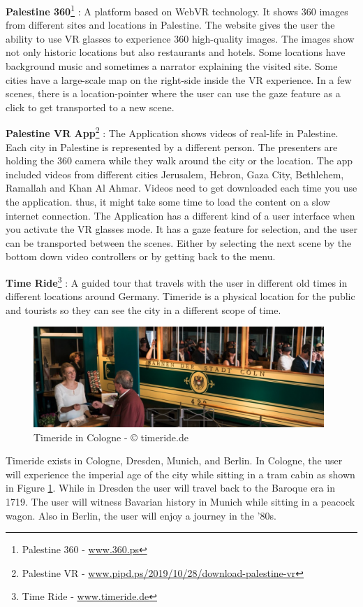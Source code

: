 \textbf{Palestine 360}\footnote{Palestine 360 - \url{www.360.ps}} : A platform based on WebVR technology. It shows 360 images from different sites and locations in Palestine. The website gives the user the ability to use VR glasses to experience 360 high-quality images. The images show not only historic locations but also restaurants and hotels. Some locations have background music and sometimes a narrator explaining the visited site. Some cities have a large-scale map on the right-side inside the VR experience. In a few scenes, there is a location-pointer where the user can use the gaze feature as a click to get transported to a new scene. 


\textbf{Palestine VR App}\footnote{Palestine VR - \url{www.pipd.ps/2019/10/28/download-palestine-vr}} : The Application shows videos of real-life in Palestine. Each city in Palestine is represented by a different person. The presenters are holding the 360 camera while they walk around the city or the location. The app included videos from different cities Jerusalem, Hebron, Gaza City, Bethlehem, Ramallah and Khan Al Ahmar. Videos need to get downloaded each time you use the application. thus, it might take some time to load the content on a slow internet connection. The Application has a different kind of a user interface when you activate the VR glasses mode. It has a gaze feature for selection, and the user can be transported between the scenes. Either by selecting the next scene by the bottom down video controllers or by getting back to the menu. 

\textbf{Time Ride}\footnote{Time Ride - \url{www.timeride.de}} : A guided tour that travels with the user in different old times in different locations around Germany. Timeride is a physical location for the public and tourists so they can see the city in a different scope of time. 
\begin{figure}[ht]
    \centering
    \includegraphics[width=0.98\textwidth]{images/timeride.png}
    \caption{Timeride in Cologne - © timeride.de }
    \label{fig:time}
\end{figure}
Timeride exists in Cologne, Dresden, Munich, and Berlin. In Cologne, the user will experience the imperial age of the city while sitting in a tram cabin as shown in Figure \ref{fig:time}. While in Dresden the user will travel back to the Baroque era in 1719. The user will witness Bavarian history in Munich while sitting in a peacock wagon. Also in Berlin, the user will enjoy a journey in the '80s.





